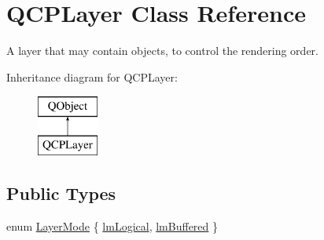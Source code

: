 \hypertarget{class_q_c_p_layer}{}\section{Q\+C\+P\+Layer Class Reference}
\label{class_q_c_p_layer}


A layer that may contain objects, to control the rendering order.  


Inheritance diagram for Q\+C\+P\+Layer\+:\begin{figure}[H]
\begin{center}
\leavevmode
\includegraphics[height=2.000000cm]{class_q_c_p_layer}
\end{center}
\end{figure}
\subsection*{Public Types}
\begin{DoxyCompactItemize}
\item 
enum \mbox{\hyperlink{class_q_c_p_layer_a67dcfc1590be2a1f2227c5a39bb59c7c}{Layer\+Mode}} \{ \mbox{\hyperlink{class_q_c_p_layer_a67dcfc1590be2a1f2227c5a39bb59c7ca02eb5e9a4cb7f1baf1e2b6b99e3b87ce}{lm\+Logical}}, 
\mbox{\hyperlink{class_q_c_p_layer_a67dcfc1590be2a1f2227c5a39bb59c7cab581b9fab3007c4c65f057f4185d7538}{lm\+Buffered}}
 \}
\end{DoxyCompactItemize}
